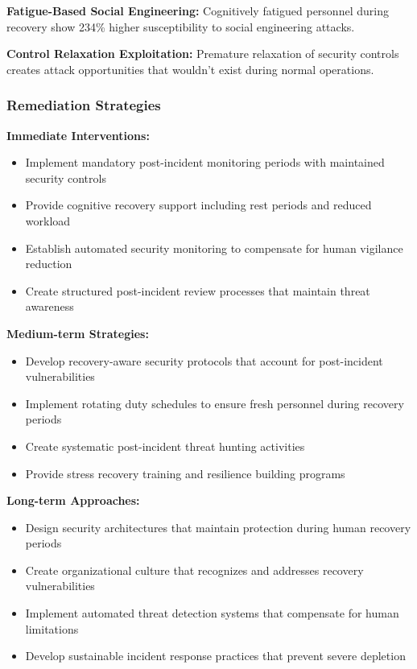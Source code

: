 \documentclass[11pt,a4paper]{article}
\begin{document}
\textbf{Fatigue-Based Social Engineering:} Cognitively fatigued personnel during recovery show 234\% higher susceptibility to social engineering attacks\cite{fatigue2022}.

\textbf{Control Relaxation Exploitation:} Premature relaxation of security controls creates attack opportunities that wouldn't exist during normal operations\cite{relaxation2023}.

\subsubsection{Remediation Strategies}

\textbf{Immediate Interventions:}
\begin{itemize}
\item Implement mandatory post-incident monitoring periods with maintained security controls
\item Provide cognitive recovery support including rest periods and reduced workload
\item Establish automated security monitoring to compensate for human vigilance reduction
\item Create structured post-incident review processes that maintain threat awareness
\end{itemize}

\textbf{Medium-term Strategies:}
\begin{itemize}
\item Develop recovery-aware security protocols that account for post-incident vulnerabilities
\item Implement rotating duty schedules to ensure fresh personnel during recovery periods
\item Create systematic post-incident threat hunting activities
\item Provide stress recovery training and resilience building programs
\end{itemize}

\textbf{Long-term Approaches:}
\begin{itemize}
\item Design security architectures that maintain protection during human recovery periods
\item Create organizational culture that recognizes and addresses recovery vulnerabilities
\item Implement automated threat detection systems that compensate for human limitations
\item Develop sustainable incident response practices that prevent severe depletion
\end{itemize}
\end{document}
